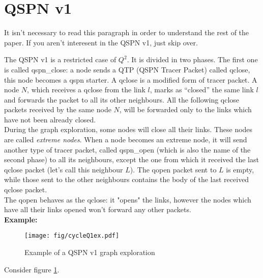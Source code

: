\documentclass[a4paper]{article}
\begin{document}
\section{QSPN v1}
\label{sec:QSPNv1}
\small{It isn't necessary to read this paragraph in order to understand the
rest of the paper. If you aren't interesent in the QSPN v1, just skip over.}

The QSPN v1 is a restricted case of $Q^2$. 
It is divided in two phases.
The first one is called qspn\_close:
a node sends a QTP (QSPN Tracer Packet) called qclose, this node becomes a qspn starter.
A qclose is a modified form of tracer packet.
  A node $N$, which receives a qclose from the link $l$, marks as ``closed'' the
  same link $l$ and forwards the packet to all its other neighbours.
  All the following qclose packets received by the same node $N$, will
  be forwarded only to the links which have not been already closed.\\
  During the graph exploration, some nodes will close all their links.
  These nodes are called \emph{extreme nodes}. When a node becomes an extreme node, 
  it will send another type of tracer packet, called qspn\_open (which is also
  the name of the second phase) to all its neighbours, except the one from
  which it received the last qclose packet (let's call this neighbour $L$).
  The qopen packet sent to $L$ is empty, while those sent to the other
  neighbours contains the body of the last received qclose packet.\\
  The qopen behaves as the qclose: it "opens" the links, however the nodes
  which have all their links opened won't forward any other packets.\\
\textbf{Example: }
  \begin{figure}[h]
  \begin{center}
	  \texttt{[image: fig/cycleQ1ex.pdf]}
	  \caption{Example of a QSPN v1 graph exploration}
	  \label{fig:q1ex}
  \end{center}
  \end{figure}
  Consider figure \ref{fig:q1ex}.
\end{document}
